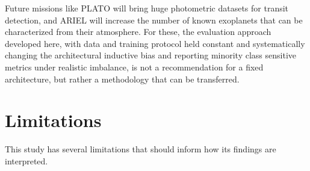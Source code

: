 \documentclass[preprint,11pt,times]{elsarticle}
\begin{document}
Future missions like PLATO \cite{bib11}  will bring huge photometric datasets for transit detection, and ARIEL \cite{bib12} will increase the number of known exoplanets that can be characterized from their atmosphere. For these, the evaluation approach developed here, with data and training protocol held constant and systematically changing the architectural inductive bias and reporting minority class sensitive metrics under realistic imbalance, is not a recommendation for a fixed architecture, but rather a methodology that can be transferred.

\section{Limitations}\label{sec9}

This study has several limitations that should inform how its findings are interpreted.
\end{document}
